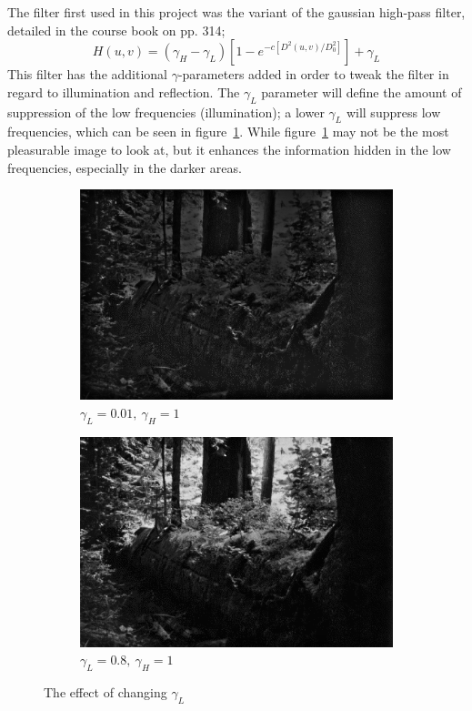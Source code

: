 		The filter first used in this project was
		the variant of the gaussian high-pass filter, detailed in the course book on pp. 314; 
		\begin{equation}
		\label{eqn:gaussian_filter}
			H(u,v) = \left( \gamma_H - \gamma_L \right) \left[ 1 - e^{-c \left[D^2(u,v)/D_0^2\right]}\right] + \gamma_L 
		\end{equation}
		This filter has the additional $\gamma$-parameters added in order to tweak
		the filter in regard to illumination and reflection. The $\gamma_L$ parameter
		will define the amount of suppression of the low frequencies (illumination); a lower $\gamma_L$
		will suppress low frequencies, which can be seen in figure~\ref{fig:low_freq_supp}. While
		figure~\ref{fig:low_freq_supp} may not be the most pleasurable image to look at, but it 
		enhances the information hidden in the low frequencies, especially in the darker areas.
		\begin{figure}[h!]
			\centering
			\begin{subfigure}[b]{0.5\linewidth}
			\includegraphics[width=0.9\linewidth]{pics/suppressed_low_frequences.png}
			\caption{$\gamma_L = 0.01,~\gamma_H = 1$}
			\label{fig:low_freq_supp}
			\end{subfigure}%
			\begin{subfigure}[b]{0.5\linewidth}
			\includegraphics[width=0.9\linewidth]{pics/non_suppressed_low_frequences.png}
			\caption{$\gamma_L = 0.8,~\gamma_H = 1$}
			\label{fig:low_freq_non_supp}
			\end{subfigure}
			\label{fig:various_low_gamma}
			\caption{The effect of changing $\gamma_L$}				
		\end{figure}		

